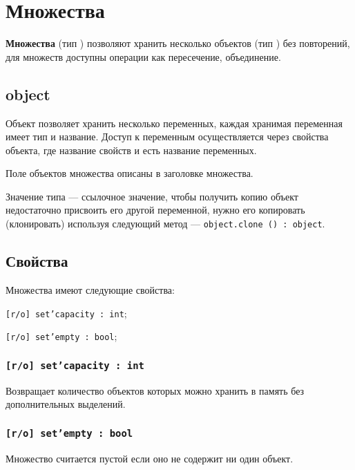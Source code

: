 \section{Множества}

{\bf Множества} (тип \set) позволяют хранить несколько объектов (тип \object) без повторений, для множеств доступны операции как пересечение, объединение.

\subsection{{\color{lightblue} object}}

Объект позволяет хранить несколько переменных, каждая хранимая переменная имеет тип и название. Доступ к переменным осуществляется через свойства объекта, где название свойств и есть название переменных. 

Поле объектов множества описаны в заголовке множества.

Значение типа \object{} — ссылочное значение, чтобы получить копию объект недостаточно присвоить его другой переменной, нужно его копировать (клонировать) используя следующий метод — \texttt{object.clone () : object}.

\subsection{Свойства}

Множества имеют следующие свойства:
\begin{icItems}
\item \texttt{[r/o] set'capacity : int};
\item \texttt{[r/o] set'empty : bool};
\end{icItems}

\subsubsection{\texttt{[r/o] set'capacity : int}}

Возвращает количество объектов которых можно хранить в память без дополнительных выделений.

\subsubsection{\texttt{[r/o] set'empty : bool}}

Множество считается пустой если оно не содержит ни один объект.

